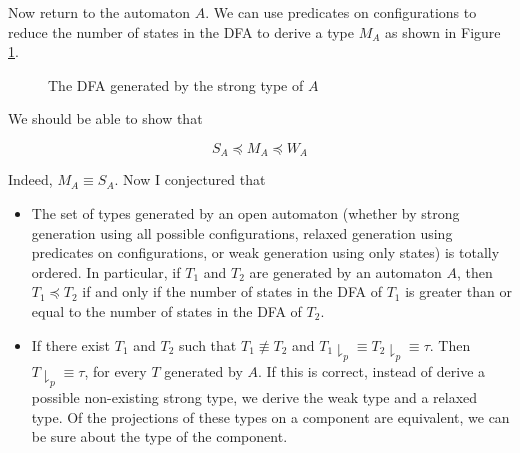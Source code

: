 Now return to the automaton $A$. We can use predicates on configurations to reduce the number of states in the DFA to derive a type $M_A$ as shown in Figure \ref{fig:middle-type}.

\begin{figure}[ht]
  \centering
  \caption{The DFA generated by the strong type of $A$}
  \label{fig:middle-type}
\end{figure}

We should be able to show that

\begin{equation}
  S_A\preceq M_A\preceq W_A
\end{equation}

Indeed, $M_A\equiv S_A$. Now I conjectured that

\begin{itemize}
  \item The set of types generated by an open automaton (whether by strong generation using all possible configurations, relaxed generation using predicates on configurations, or weak generation using only states) is totally ordered. In particular, if $T_1$ and $T_2$ are generated by an automaton $A$, then $T_1\preceq T_2$ if and only if the number of states in the DFA of $T_1$ is greater than or equal to the number of states in the DFA of $T_2$.
  \item If there exist $T_1$ and $T_2$ such that $T_1\not\equiv T_2$ and $T_1\downharpoonright_p \equiv T_2\downharpoonright_p \equiv\tau$. Then $T\downharpoonright_p\equiv\tau$, for every $T$ generated by $A$. If this is correct, instead of derive a possible non-existing strong type, we derive the weak type and a relaxed type. Of the projections of these types on a component are equivalent, we can be sure about the type of the component.
\end{itemize}


